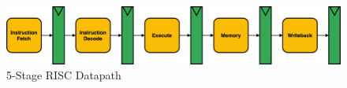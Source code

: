\begin{figure}[H]
    \includegraphics[draft=false,width=\linewidth]{chapters/chapter4/img/RISC-Datapath.png}
    \caption{5-Stage \ac{RISC} Datapath}
    \label{fig:RISC-Datapath}
\end{figure}